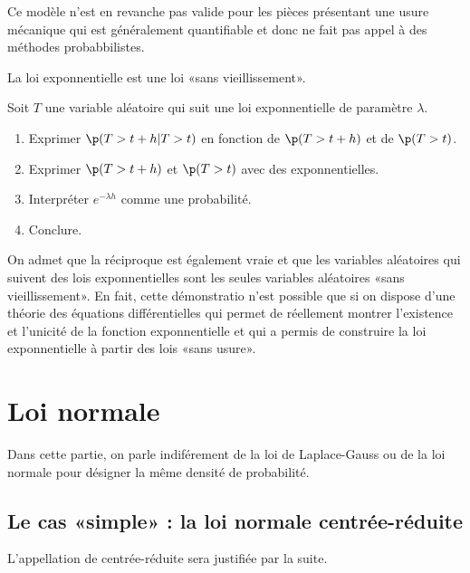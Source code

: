 \documentclass[11pt,a4paper,french]{article}
\begin{document}
Ce modèle n'est en revanche pas valide pour les pièces présentant une
usure mécanique qui est généralement quantifiable et donc ne fait pas
appel à des méthodes probabbilistes.

\begin{propriete}
  La loi exponnentielle est une loi «sans vieillissement».
\end{propriete}
\begin{preuve}
  \begin{exercice}
    Soit $T$ une variable aléatoire qui suit une loi exponnentielle de
    paramètre $\lambda$.
    \begin{enumerate}
      \item Exprimer $\p(T > t+h | T > t)$ en fonction de $\p(T > t+h)$
        et de $\p(T > t)$.
      \item Exprimer $\p(T > t+h)$ et $\p(T > t)$ avec des
        exponnentielles.
      \item Interpréter $e^{-\lambda h}$ comme une probabilité.
      \item Conclure.
    \end{enumerate}
  \end{exercice}
\end{preuve}

On admet que la réciproque est également vraie et que les variables
aléatoires qui suivent des lois exponnentielles sont les seules
variables aléatoires «sans vieillissement». En fait, cette démonstratio
n'est possible que si on dispose d'une théorie des équations
différentielles qui permet de réellement montrer l'existence et
l'unicité de la fonction exponnentielle et qui a permis de construire la
loi exponnentielle à partir des lois «sans usure».

\pagebreak

\section{Loi normale}

Dans cette partie, on parle indiférement de la loi de Laplace-Gauss ou
de la loi normale pour désigner la même densité de probabilité.

\subsection{Le cas «simple» : la loi normale centrée-réduite}

L'appellation de centrée-réduite sera justifiée par la suite.
\end{document}
